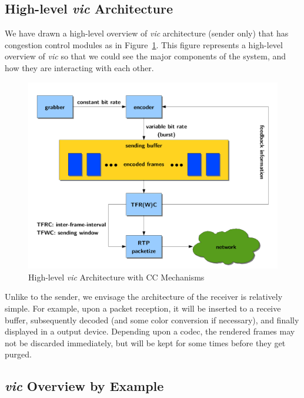 
\subsection{\label{ssec:high-arch}High-level \emph{vic} Architecture}

We have drawn a high-level overview of \emph{vic} architecture (sender only)
that has congestion control modules as in Figure~\ref{fig:high-vic-arch}. This
figure represents a high-level overview of \emph{vic} so that we could see the
major components of the system, and how they are interacting with each other. 

\vspace{1cm}

\begin{figure}[!h]
\begin{center}
\includegraphics[scale=.5]{./img/high-vic-arch}
\caption{\label{fig:high-vic-arch}High-level \emph{vic} Architecture 
with CC Mechanisms}
\end{center}
\end{figure}

Unlike to the sender, we envisage the architecture of the receiver is relatively
simple. For example, upon a packet reception, it will be inserted to a receive
buffer, subsequently decoded (and some color conversion if necessary), and
finally displayed in a output device. Depending upon a codec, the rendered
frames may not be discarded immediately, but will be kept for some times before
they get purged.

\subsection{\label{ssec:vic-overview}\emph{vic} Overview by Example}

